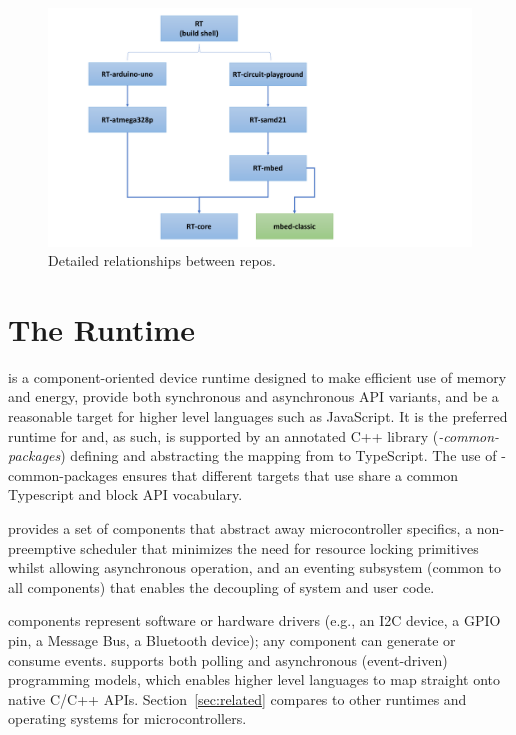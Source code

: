 \begin{figure}[t]
    \includegraphics[width=4.5in]{codalFig.pdf}
    \caption{\label{fig:codal}Detailed relationships between \CO repos.}
\end{figure}

\section{The \CO Runtime}
\label{sec:codal}

\CO is a component-oriented device runtime designed to make efficient use of memory and energy, provide both synchronous and asynchronous API variants, and be a reasonable target for higher level languages such as JavaScript.  It is the preferred runtime
for \MC and, as such, is supported by an annotated C++ library (\emph{\MCN-common-packages}) defining and abstracting
the mapping from \CO to TypeScript. The use of \MCN-common-packages ensures that different \MC targets that 
use \CO share a common Typescript and block API vocabulary.

\CO provides a set of components that abstract away microcontroller specifics, a non-preemptive scheduler that minimizes the need for resource locking primitives whilst allowing asynchronous operation, and an eventing subsystem (common to all components) that enables the decoupling of system and user code.

\CO components represent software or hardware drivers (e.g., an I2C device, a GPIO pin, a Message Bus, a Bluetooth device); any component can generate or consume events. \CO supports both polling and asynchronous (event-driven) programming models, which enables higher level languages to map straight onto native C/C++ APIs. Section~\ref{sec:related} compares \CO to other runtimes and operating systems for microcontrollers.


